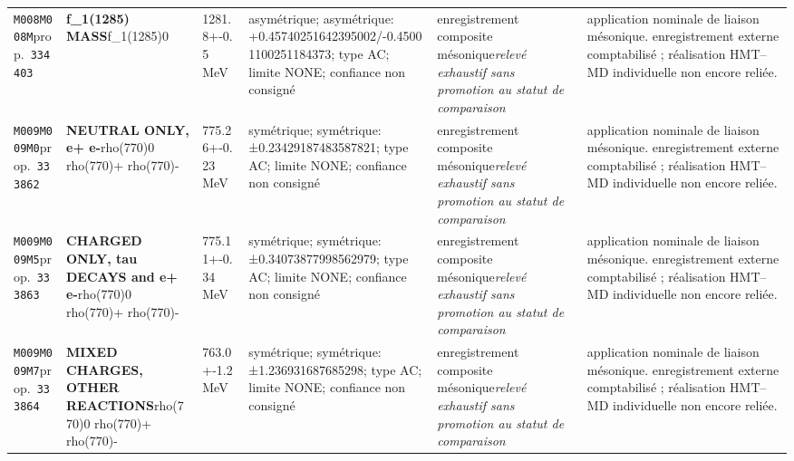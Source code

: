 \begin{landscape}
\begin{longtable}{L{1.85cm}L{4.45cm}L{2.35cm}L{4.05cm}L{3.35cm}L{7.15cm}}
\texttt{M008}\newline \texttt{M008M}\newline prop.\ \texttt{334403} & \textbf{f\_\allowbreak{}1(1285) MASS}\newline f\_\allowbreak{}1(1285)0 & 1281.8+-0.5\,MeV & asymétrique; asymétrique: +0.45740251642395002/-0.45001100251184373; type AC; limite NONE; confiance non consigné & enregistrement composite mésonique\newline \emph{relevé exhaustif sans promotion au statut de comparaison} & application nominale de liaison mésonique. enregistrement externe comptabilisé ; réalisation HMT--MD individuelle non encore reliée. \\
\texttt{M009}\newline \texttt{M009M0}\newline prop.\ \texttt{333862} & \textbf{NEUTRAL ONLY, e+ e-}\newline rho(770)0 \textbar{}\allowbreak{} rho(770)+ \textbar{}\allowbreak{} rho(770)- & 775.26+-0.23\,MeV & symétrique; symétrique: ±0.23429187483587821; type AC; limite NONE; confiance non consigné & enregistrement composite mésonique\newline \emph{relevé exhaustif sans promotion au statut de comparaison} & application nominale de liaison mésonique. enregistrement externe comptabilisé ; réalisation HMT--MD individuelle non encore reliée. \\
\texttt{M009}\newline \texttt{M009M5}\newline prop.\ \texttt{333863} & \textbf{CHARGED ONLY, tau DECAYS and e+ e-}\newline rho(770)0 \textbar{}\allowbreak{} rho(770)+ \textbar{}\allowbreak{} rho(770)- & 775.11+-0.34\,MeV & symétrique; symétrique: ±0.34073877998562979; type AC; limite NONE; confiance non consigné & enregistrement composite mésonique\newline \emph{relevé exhaustif sans promotion au statut de comparaison} & application nominale de liaison mésonique. enregistrement externe comptabilisé ; réalisation HMT--MD individuelle non encore reliée. \\
\texttt{M009}\newline \texttt{M009M7}\newline prop.\ \texttt{333864} & \textbf{MIXED CHARGES, OTHER REACTIONS}\newline rho(770)0 \textbar{}\allowbreak{} rho(770)+ \textbar{}\allowbreak{} rho(770)- & 763.0+-1.2\,MeV & symétrique; symétrique: ±1.236931687685298; type AC; limite NONE; confiance non consigné & enregistrement composite mésonique\newline \emph{relevé exhaustif sans promotion au statut de comparaison} & application nominale de liaison mésonique. enregistrement externe comptabilisé ; réalisation HMT--MD individuelle non encore reliée. \\

\end{longtable}
\end{landscape}
